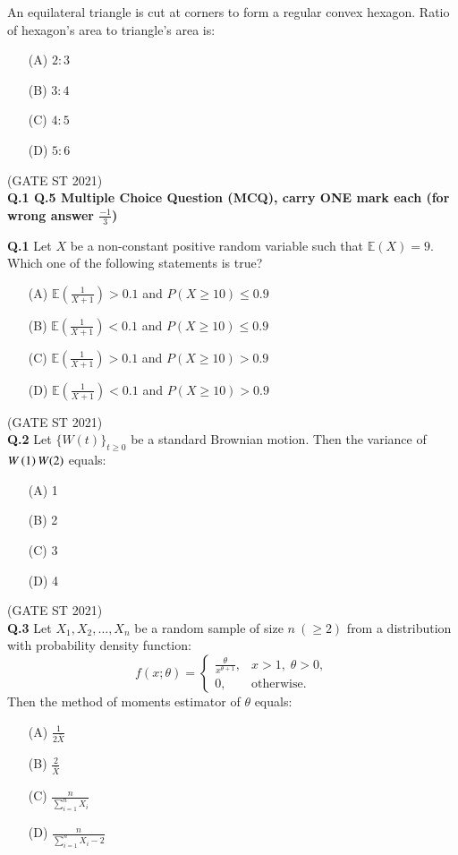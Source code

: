 \documentclass[journal,12pt,onecolumn]{IEEEtran}
\theoremstyle{remark}
\begin{document}
An equilateral triangle is cut at corners to form a regular convex hexagon.  
Ratio of hexagon's area to triangle's area is:

\begin{enumerate}
\item[(A)] $2:3$
\item[(B)] $3:4$
\item[(C)] $4:5$
\item[(D)] $5:6$
\end{enumerate}

\hfill (GATE ST 2021) \\


\textbf{Q.1 \text{-} Q.5 Multiple Choice Question (MCQ), carry ONE mark each (for wrong answer $\frac{-1}{3}$)}


\textbf{Q.1}
Let $X$ be a non-constant positive random variable such that $\mathbb{E}(X) = 9$.  
Which one of the following statements is true?

\begin{enumerate}
\item[(A)] $\mathbb{E}\left( \frac{1}{X+1} \right) > 0.1$ and $P(X \geq 10) \leq 0.9$
\item[(B)] $\mathbb{E}\left( \frac{1}{X+1} \right) < 0.1$ and $P(X \geq 10) \leq 0.9$
\item[(C)] $\mathbb{E}\left( \frac{1}{X+1} \right) > 0.1$ and $P(X \geq 10) > 0.9$
\item[(D)] $\mathbb{E}\left( \frac{1}{X+1} \right) < 0.1$ and $P(X \geq 10) > 0.9$
\end{enumerate}

\hfill (GATE ST 2021) \\


\textbf{Q.2}
Let $\{W(t)\}_{t \geq 0}$ be a standard Brownian motion.  
Then the variance of $W\left(1\right) W(2)$ equals:
\begin{enumerate}
\item[(A)] 1
\item[(B)] 2
\item[(C)] 3
\item[(D)] 4
\end{enumerate}

\hfill (GATE ST 2021) \\

\textbf{Q.3}
Let $X_1, X_2, \dots, X_n$ be a random sample of size $n \ (\geq 2)$ from a distribution with probability density function:
\[
f(x; \theta) =
\begin{cases}
\frac{\theta}{x^{\theta+1}}, & x > 1, \; \theta > 0, \\
0, & \text{otherwise}.
\end{cases}
\]
Then the method of moments estimator of $\theta$ equals:
\begin{enumerate}
\item[(A)] $\frac{1}{2\bar{X}}$
\item[(B)] $\frac{2}{\bar{X}}$
\item[(C)] $\frac{n}{\sum_{i=1}^n X_i}$
\item[(D)] $\frac{n}{\sum_{i=1}^n X_i - 2}$
\end{enumerate}
\end{document}

